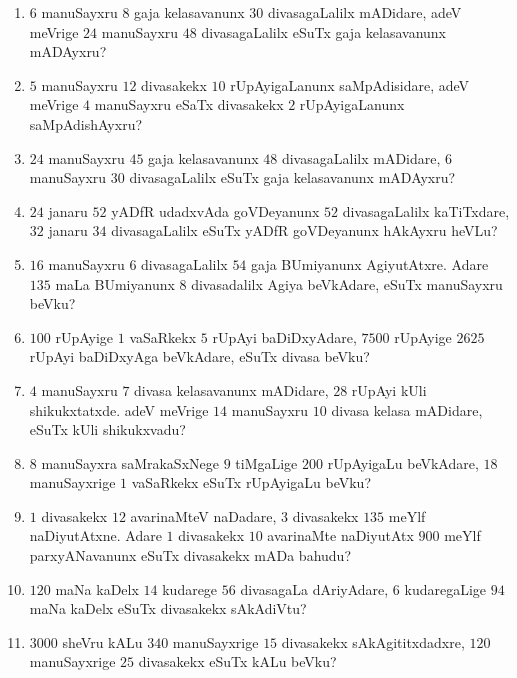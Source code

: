 \begin{enumerate}[\rm (1)]
\item $6$ manuSayxru $8$ gaja kelasavanunx $30$ divasagaLalilx mADidare, adeV meVrige $24$ manuSayxru $48$ divasagaLalilx eSuTx gaja kelasavanunx mADAyxru?

\item $5$ manuSayxru $12$ divasakekx $10$ rUpAyigaLanunx saMpAdisidare, adeV meVrige $4$ manuSayxru eSaTx divasakekx $2$ rUpAyigaLanunx saMpAdishAyxru?

\item $24$ manuSayxru $45$ gaja kelasavanunx $48$ divasagaLalilx mADidare, $6$ manuSayxru $30$ divasagaLalilx eSuTx gaja kelasavanunx mADAyxru?

\item $24$ janaru $52$ yADfR udadxvAda goVDeyanunx $52$ divasagaLalilx kaTiTxdare, $32$ janaru $34$ divasagaLalilx eSuTx yADfR goVDeyanunx hAkAyxru heVLu?

\item $16$ manuSayxru $6$ divasagaLalilx $54$ gaja BUmiyanunx AgiyutAtxre. Adare $135$ maLa BUmiyanunx $8$ divasadalilx Agiya beVkAdare, eSuTx manuSayxru beVku?

\item $100$ rUpAyige $1$ vaSaRkekx $5$ rUpAyi baDiDxyAdare, $7500$ rUpAyige $2625$ rUpAyi baDiDxyAga beVkAdare, eSuTx divasa beVku?

\item $4$ manuSayxru $7$ divasa kelasavanunx mADidare, $28$ rUpAyi kUli shikukxtatxde. adeV meVrige $14$ manuSayxru $10$ divasa kelasa mADidare, eSuTx kUli shikukxvadu?

\item $8$ manuSayxra saMrakaSxNege $9$ tiMgaLige $200$ rUpAyigaLu beVkAdare, $18$ manuSayxrige $1$ vaSaRkekx eSuTx rUpAyigaLu beVku?

\item $1$ divasakekx $12$ avarinaMteV naDadare, $3$ divasakekx $135$ meYlf naDiyutAtxne. Adare $1$ divasakekx $10$ avarinaMte naDiyutAtx $900$ meYlf parxyANavanunx eSuTx divasakekx mADa bahudu?

\item $120$ maNa kaDelx $14$ kudarege $56$ divasagaLa dAriyAdare, $6$ kudaregaLige $94$ maNa kaDelx eSuTx divasakekx sAkAdiVtu?

\item $3000$ sheVru kALu $340$ manuSayxrige $15$ divasakekx sAkAgititxdadxre, $120$ manuSayxrige $25$ divasakekx eSuTx kALu beVku?


\end{enumerate}
